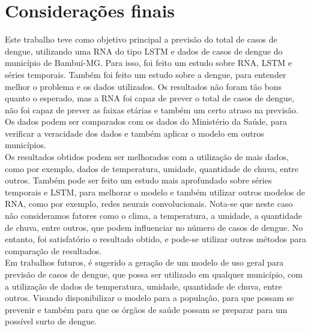 \documentclass[
	article,			%
	12pt,				%
	a4paper,			%
	chapter=TITLE,		%
	section=TITLE,		%
	subsection=TITLE,	%
	subsubsection=TITLE %
	english,			%
	brazil,				%
	sumario=tradicional
	]{abntex2}
\begin{document}
 
\section{Considerações finais}
Este trabalho teve como objetivo principal a previsão do total de casos de dengue, utilizando uma RNA do tipo LSTM e dados de casos de dengue do município de Bambuí-MG. Para isso, foi feito um estudo sobre RNA, LSTM e séries temporais. Também foi feito um estudo sobre a dengue, para entender melhor o problema e os dados utilizados. Os resultados não foram tão bons quanto o esperado, mas a RNA foi capaz de prever o total de casos de dengue, não foi capaz de prever as faixas etárias e também um certo atraso na previsão. Os dados podem ser comparados com os dados do Ministério da Saúde, para verificar a veracidade dos dados e também aplicar o modelo em outros municípios. 
\\ \indent
Os resultados obtidos podem ser melhorados com a utilização de mais dados, como por exemplo, dados de temperatura, umidade, quantidade de chuva, entre outros. Também pode ser feito um estudo mais aprofundado sobre séries temporais e LSTM, para melhorar o modelo e também utilizar outros modelos de RNA, como por exemplo, redes neurais convolucionais. Nota-se que neste caso não consideramos fatores como o clima, a temperatura, a umidade, a quantidade de chuva, entre outros, que podem influenciar no número de casos de dengue. No entanto, foi satisfatório o resultado obtido, e pode-se utilizar outros métodos para comparação de resultados. 
\\ \indent
Em trabalhos futuros, é sugerido a geração de um modelo de uso geral para previsão de casos de dengue, que possa ser utilizado em qualquer município, com a utilização de dados de temperatura, umidade, quantidade de chuva, entre outros. Visando disponibilizar o modelo para a população, para que possam se prevenir e também para que os órgãos de saúde possam se preparar para um possível surto de dengue.

\begin{citacao}

\end{citacao}



\postextual


\end{document}
